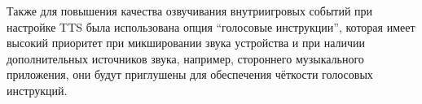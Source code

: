 Также для повышения качества озвучивания внутриигровых событий при настройке TTS была использована опция ``голосовые инструкции'', которая имеет высокий приоритет при микшировании звука устройства и при наличии дополнительных источников звука, например, стороннего музыкального приложения, они будут приглушены для обеспечения чёткости голосовых инструкций.
